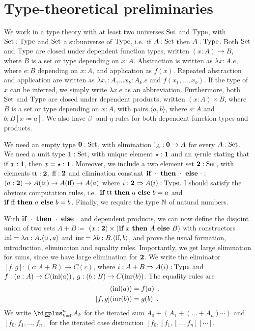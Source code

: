 \documentclass{article}
\begin{document}
\section{Type-theoretical preliminaries}
\label{sec:preliminaries}

We work in a type theory with at least two universes $\text{Set}$ and
$\text{Type}$, with $\text{Set} : \text{Type}$ and $\text{Set}$ a subuniverse of $\text{Type}$,
i.e.\ if $A : \text{Set}$ then $A : \text{Type}$. Both $\text{Set}$ and $\text{Type}$ are
closed under dependent function types, written $(x : A) \to B$, where
$B$ is a set or type depending on $x: A$. Abstraction is written as
$\lambda x : A . e$, where $e : B$ depending on $x : A$, and
application as $f(x)$. Repeated abstraction and application are
written as $\lambda x_1 : A_1 \ldots x_k : A_k . e$ and $f(x_1,
\ldots, x_k)$. If the type of $x$ can be inferred, we simply write
$\lambda x.e$ as an abbreviation.  Furthermore, both $\text{Set}$ and
$\text{Type}$ are closed under dependent products, written $(x : A) \times
B$, where $B$ is a set or type depending on $x: A$, with pairs
$\langle a , b \rangle$, where $a : A$ and $b : B[x \coloneqq a]$.
We also have $\beta$- and $\eta$-rules for both dependent function types
and products.

We need an empty type $\mathbf{0} : \text{Set}$, with elimination ${!_A : \mathbf{0}
  \to A}$ for every $A : \text{Set}$. We need a unit type $\mathbf{1} : \text{Set}$,
with unique element $\star : \mathbf{1}$ and an $\eta$-rule stating that
if $x : \mathbf{1}$, then $x = \star : \mathbf{1}$. Moreover, we include a two
element set $\mathbf{2} : \text{Set}$, with elements $\text{tt} : \mathbf{2}$, $\text{ff} :
\mathbf{2}$ and elimination constant $\textbf{if}~\cdot~\textbf{then}~\cdot~\textbf{else}~\cdot :$
$(a : \mathbf{2}) \to A(\text{tt}) \to A(\text{ff}) \to A(a)$ where $i : \mathbf{2}
\Rightarrow A(i) : \text{Type}$. I should satisfy the obvious computation
rules, i.e.\ $\textbf{if}~\text{tt}~\textbf{then}~a~\textbf{else}~b = a$ and
$\textbf{if}~\text{ff}~\textbf{then}~a~\textbf{else}~b = b$. Finally, we require the type $\mathbb{N}$
of natural numbers.

With $\textbf{if}~\cdot~\textbf{then}~\cdot~\textbf{else}~\cdot$ and dependent products, we can now
define the disjoint union of two sets $A + B \coloneqq$ ${(x : \mathbf{2})}
\times (\textbf{if}~x~\textbf{then}~A~\textbf{else}~B)$ with constructors $\text{inl} = \lambda {a :
  A} . \langle \text{tt} , a \rangle$ and $\text{inr} = \lambda {b : B}
. \langle \text{ff} , b \rangle$, and prove the usual formation,
introduction, elimination and equality rules. Importantly, we get
large elimination for sums, since we have large elimination for
$\mathbf{2}$. We write the eliminator $[f, g] : {(c : A + B)} \to C(c)$, where
$i : A + B \Rightarrow A(i) : \text{Type}$ and $f : (a : A) \to C(\text{inl}(a))$,
$g : (b : B) \to C(\text{inr}(b))$. The equality rules are
\begin{align*}
[f, g](\inl(a)) &= f(a) \enspace , \\
[f, g](\inr(b)) &= g(b) \enspace .
\end{align*}
We write $\bigplus_{k = 0}^n A_k$ for the iterated sum $A_0 + (A_1 +
(\ldots + A_n)\cdots)$ and $[f_0, f_1, \ldots, f_n]$ for the iterated
case distinction $[f_0, [f_1, [\ldots , f_n]]\cdots]$.
\end{document}
